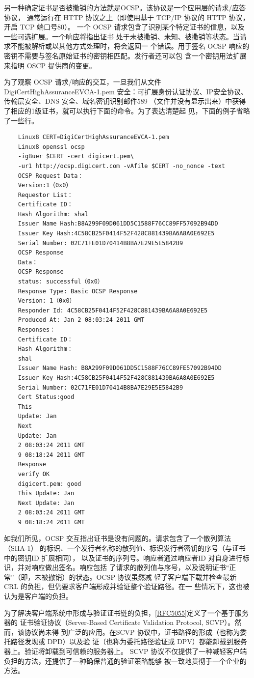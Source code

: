 另一种确定证书是否被撤销的方法就是OCSP。该协议是一个应用层的请求/应答协议，
通常运行在 HTTP 协议之上（即使用基于 TCP/IP 协议的 HTTP 协议，开启 TCP 端口号80）。
一个 OCSP 请求包含了识别某个特定证书的信息，以及一些可选扩展。一个响应将指出证书
处于未被撒销、未知、被撒销等状态。当请求不能被解析或以其他方式处理时，将会返回一
个错误。用于签名 OCSP 响应的密钥不需要与签名原始证书的密钥相匹配。发行者还可以包
含一个密钥用法扩展来指明 OSCP 提供商的变更。

为了观察 OCSP 请求/响应的交互，一旦我们从文件 DigiCertHighAssuranceEVCA-1.pem
安全：可扩展身份认证协议、IP安全协议、传輸层安全、DNS 安全、域名密钥识别邮件589
（文件并没有显示出来）中获得了相应的1级证书，就可以执行下面的命令。为了表达清楚起
见，下面的例子省略了一些行。
\begin{verbatim}
    Linux8 CERT=DigiCertHighAssuranceEVCA-1.pem
    Linux8 openssl ocsp
    -igBuer $CERT -cert digicert.pem\
    -ur1 http://ocsp.digicert.com -vAfile $CERT -no_nonce -text
    OCSP Request Data：
    Version:1（0x0）
    Requestor List：
    Certificate ID：
    Hash Algorithm: shal
    Issuer Name Hash:B8A299F09D061DD5C1588F76CC89FF57092B94DD
    Issuer Key Hash:4C58CB25F0414F52F428C881439BA6A8A0E692E5
    Serial Number: 02C71FE01D70414B8BA7E29E5E5842B9
    OCSP Response
    Data：
    OCSP Response
    status: successful（0x0）
    Response Type: Basic OCSP Response
    Version: 1（0x0）
    Responder Id: 4C58CB25F0414F52F428C881439BA6A8A0E692E5
    Produced At: Jan 2 08:03:24 2011 GMT
    Responses：
    Certificate ID：
    Hash Algorithm：
    shal
    Issuer Name Hash: B8A299F09D061DD5C1588F76CC89FE57092B94DD
    Issuer Key Hash:4C58CB25F0414F52F428C881439BA6A8A0E692E5
    Serial Number: 02C71FE01D70414B8BA7E29E5E5842B9
    Cert Status:good
    This
    Update: Jan
    Next
    Update: Jan
    2 08:03:24 2011 GMT
    9 08:18:24 2011 GMT
    Response
    verify OK
    digicert.pem: good
    This Update: Jan
    Next Update: Jan
    2 08:03:24 2011 GMT
    9 08:18:24 2011 GMT
\end{verbatim}
如我们所见，OCSP 交互指出证书是没有问题的。请求包含了一个散列算法（SHA-1）
的标识、一个发行者名称的散列值、标识发行者密钥的序号（与证书中的密钥ID 扩展相同），
以及证书的序列号。响应者通过响应者ID 对自身进行标识，并对响应做出签名。响应包括
了请求的散列值与序号，以及说明证书“正常”（即，未被撤销）的状态。OCSP 协议虽然减
轻了客户端下载并检查最新 CRL 的负担，但仍要求客户端形成并验证整个验证路径。在一
些情况下，这也被认为是客户端的负担。

为了解决客户端系统中形成与验证证书链的负担，\href{https://www.rfc-editor.org/rfc/rfc5055}{[RFC5055]}定义了一个基于服务器的
证书验证协议（Server-Based Certificate Validation Protocol, SCVP）。然而，该协议尚未得
到广泛的应用。在SCVP 协议中，证书路径的形成（也称为委托路径发现或 DPD）以及验
证（也称为委托路径验证或 DPV）都能卸载到服务器上。验证将卸载到可信赖的服务器上。
SCVP 协议不仅提供了一种减轻客户端负担的方法，还提供了一种确保普通的验证策略能够
被一致地贯彻于一个企业的方法。

